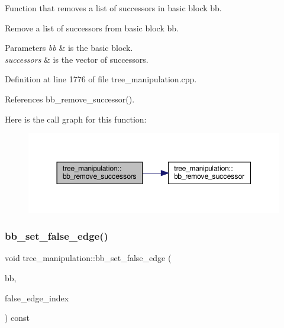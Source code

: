 Function that removes a list of successors in basic block bb. 

Remove a list of successors from basic block bb.


\begin{DoxyParams}{Parameters}
{\em bb} & is the basic block. \\
\hline
{\em successors} & is the vector of successors. \\
\hline
\end{DoxyParams}


Definition at line 1776 of file tree\+\_\+manipulation.\+cpp.



References bb\+\_\+remove\+\_\+successor().

Here is the call graph for this function\+:
\nopagebreak
\begin{figure}[H]
\begin{center}
\leavevmode
\includegraphics[width=350pt]{d0/d99/classtree__manipulation_a2d4bd5bfcf97b6d1bafb832d3174c31b_cgraph}
\end{center}
\end{figure}
\mbox{\label{classtree__manipulation_ab902ec332170d876d21908002f761918}} 
\subsubsection{\texorpdfstring{bb\+\_\+set\+\_\+false\+\_\+edge()}{bb\_set\_false\_edge()}}
{\footnotesize\ttfamily void tree\+\_\+manipulation\+::bb\+\_\+set\+\_\+false\+\_\+edge (\begin{DoxyParamCaption}\item[{bloc\+Ref \&}]{bb,  }\item[{const unsigned int \&}]{false\+\_\+edge\+\_\+index }\end{DoxyParamCaption}) const}



